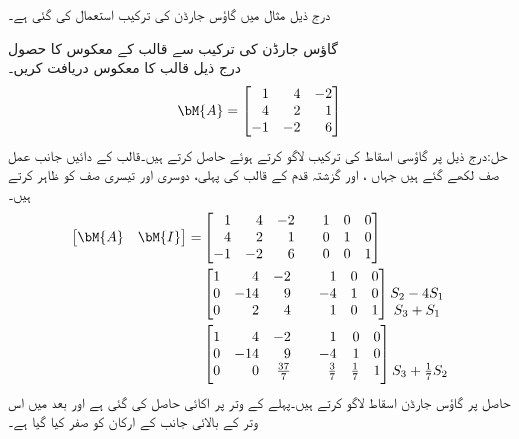 درج ذیل مثال میں گاؤس جارڈن کی ترکیب استعمال کی گئی ہے۔

\quad گاؤس جارڈن کی ترکیب سے قالب کے معکوس کا حصول\\
درج ذیل قالب  کا معکوس  دریافت کریں۔
\begin{align*}
\bM{A}=\begin{bmatrix*}[r] 1&4&-2\\4&2&1\\-1&-2&6 \end{bmatrix*}
\end{align*}
حل:درج ذیل  پر گاؤسی اسقاط کی ترکیب لاگو کرتے ہوئے  حاصل کرتے ہیں۔قالب کے دائیں جانب عمل صف لکھے گئے ہیں جہاں ،  اور  گزشتہ قدم کے قالب کی پہلی، دوسری اور تیسری صف کو ظاہر کرتے ہیں۔
\begin{align*}
\begin{bmatrix}\bM{A}&\bM{I}  \end{bmatrix}=&\begin{bmatrix*}[r] 1&4&-2&& 1&0&0\\4&2&1 && 0&1&0\\-1&-2&6 && 0&0&1\end{bmatrix*}\\
&\begin{bmatrix*}[r] 1&4&-2&& 1&0&0\\0&-14&9&&-4&1&0\\0&2&4&&1&0&1\end{bmatrix*}
\begin{matrix} \\S_2-4S_1\\S_3+S_1 \end{matrix}\\
&\begin{bmatrix*}[r] 1&4&-2&& 1&0&0\\0&-14&9&&-4&1&0\\0&0&\frac{37}{7}&&\frac{3}{7}&\frac{1}{7}&1\end{bmatrix*}
\begin{matrix} \\ \\S_3+\frac{1}{7}S_2 \end{matrix}
\end{align*}
حاصل  پر گاؤس جارڈن اسقاط لاگو کرتے ہیں۔پہلے  کے وتر پر اکائی حاصل کی گئی ہے اور بعد میں اس وتر کے بالائی جانب  کے ارکان کو صفر کیا گیا ہے۔
